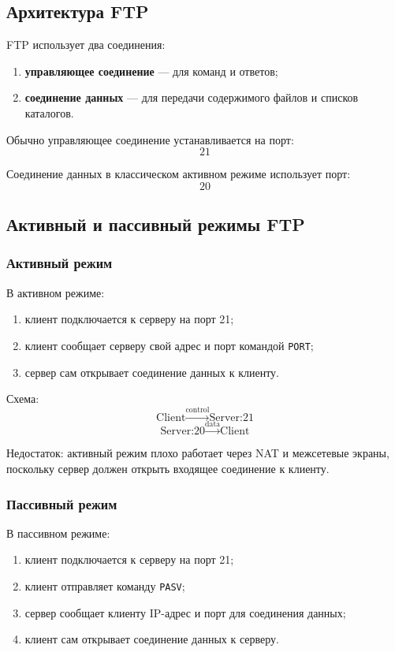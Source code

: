 \documentclass[12pt,a4paper]{article}
\begin{document}
\subsection{Архитектура FTP}

FTP использует два соединения:
\begin{enumerate}
    \item \textbf{управляющее соединение} --- для команд и ответов;
    \item \textbf{соединение данных} --- для передачи содержимого файлов и списков каталогов.
\end{enumerate}

Обычно управляющее соединение устанавливается на порт:
\[
21
\]

Соединение данных в классическом активном режиме использует порт:
\[
20
\]

\subsection{Активный и пассивный режимы FTP}

\subsubsection{Активный режим}

В активном режиме:
\begin{enumerate}
    \item клиент подключается к серверу на порт 21;
    \item клиент сообщает серверу свой адрес и порт командой \texttt{PORT};
    \item сервер сам открывает соединение данных к клиенту.
\end{enumerate}

Схема:
\[
\text{Client} \xrightarrow{\text{control}} \text{Server:21}
\]
\[
\text{Server:20} \xrightarrow{\text{data}} \text{Client}
\]

Недостаток: активный режим плохо работает через NAT и межсетевые экраны, поскольку сервер должен открыть входящее соединение к клиенту.

\subsubsection{Пассивный режим}

В пассивном режиме:
\begin{enumerate}
    \item клиент подключается к серверу на порт 21;
    \item клиент отправляет команду \texttt{PASV};
    \item сервер сообщает клиенту IP-адрес и порт для соединения данных;
    \item клиент сам открывает соединение данных к серверу.
\end{enumerate}
\end{document}
